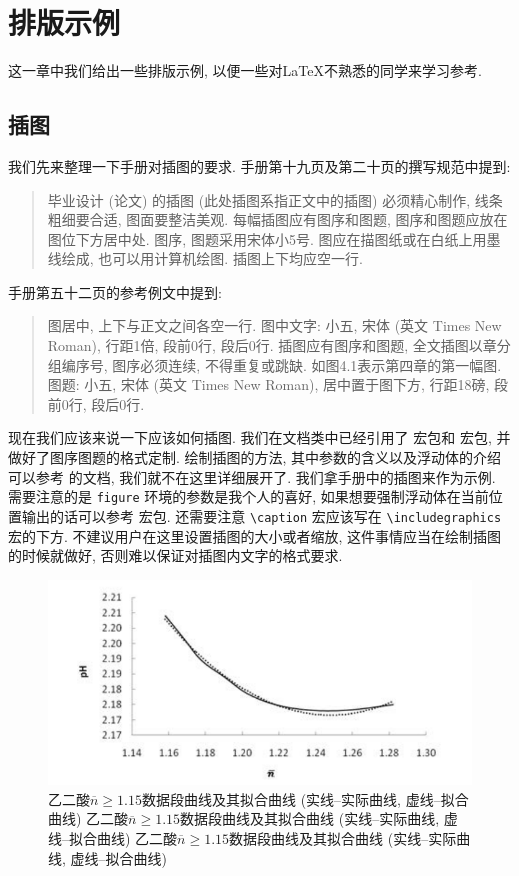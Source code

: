 
\section{排版示例}

这一章中我们给出一些排版示例, 以便一些对\LaTeX 不熟悉的同学来学习参考.

\subsection{插图}

我们先来整理一下手册对插图的要求. 手册第十九页及第二十页的撰写规范中提到:
\begin{quote}
  毕业设计 (论文) 的插图 (此处插图系指正文中的插图) 必须精心制作, 线条粗细要合适, 图面要整洁美观. 每幅插图应有图序和图题, 图序和图题应放在图位下方居中处. 图序, 图题采用宋体小5号. 图应在描图纸或在白纸上用墨线绘成, 也可以用计算机绘图. 插图上下均应空一行.
\end{quote}
手册第五十二页的参考例文中提到:
\begin{quote}
  图居中, 上下与正文之间各空一行.
  图中文字: 小五, 宋体 (英文 Times New Roman), 行距1倍, 段前0行, 段后0行.
  插图应有图序和图题, 全文插图以章分组编序号, 图序必须连续, 不得重复或跳缺. 如图4.1表示第四章的第一幅图.
  图题: 小五, 宋体 (英文 Times New Roman), 居中置于图下方, 行距18磅, 段前0行, 段后0行.
\end{quote}

现在我们应该来说一下应该如何插图. 我们在文档类中已经引用了  宏包\footnotemark 和  宏包, 并做好了图序图题的格式定制. 绘制插图的方法, 其中参数的含义以及浮动体的介绍可以参考  的文档, 我们就不在这里详细展开了. 我们拿手册中的插图来作为示例. 需要注意的是 \verb|figure| 环境的参数是我个人的喜好, 如果想要强制浮动体在当前位置输出的话可以参考  宏包. 还需要注意 \verb|\caption| 宏应该写在 \verb|\includegraphics| 宏的下方. 不建议用户在这里设置插图的大小或者缩放, 这件事情应当在绘制插图的时候就做好, 否则难以保证对插图内文字的格式要求.

\begin{figure}[htb]
  \centering
  \includegraphics{figures/oxalic-acid-n-geq-1.15.pdf}
  \caption{乙二酸$\overline{n}\geq 1.15$数据段曲线及其拟合曲线 (实线--实际曲线, 虚线--拟合曲线) 乙二酸$\overline{n}\geq 1.15$数据段曲线及其拟合曲线 (实线--实际曲线, 虚线--拟合曲线) 乙二酸$\overline{n}\geq 1.15$数据段曲线及其拟合曲线 (实线--实际曲线, 虚线--拟合曲线)}
\end{figure}

